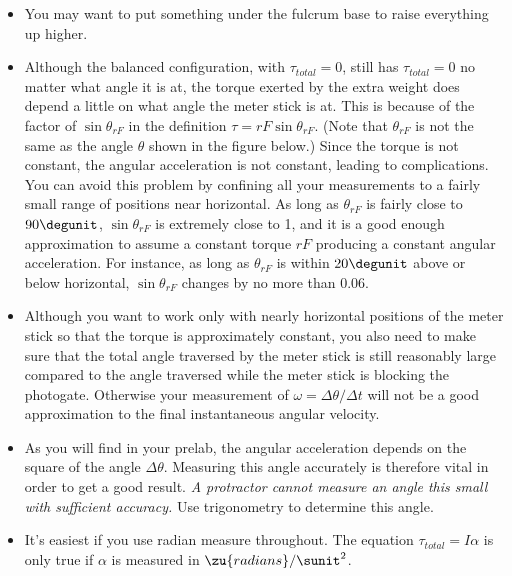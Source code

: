 \begin{itemize}
\item[] You may want to put something under the fulcrum base to
raise everything up higher.

\item[] Although the balanced configuration, with $\tau_{total}=0$,
still has $\tau_{total}=0$ no matter what angle it is at,
the torque exerted by the extra weight does depend a little
on what angle the meter stick is at.  This is because of the
factor of $\sin\theta_{rF} $ in the definition $\tau=rF\sin\theta_{rF} $. 
(Note that $\theta_{rF}$ is not the same as the angle $\theta$
shown in the figure below.)
Since the torque is not constant, the
angular acceleration is not constant, leading to complications.
 You can avoid this problem by confining all your measurements
to a fairly small range of positions near horizontal.  As
long as $\theta_{rF} $ is fairly close to $90\degunit$, $\sin\theta_{rF} $ 
is extremely close to 1, and it is a good enough
approximation to assume a constant torque $rF$
producing a constant angular acceleration. For instance, as
long as $\theta_{rF} $ is within $20\degunit$ above or below
horizontal, $\sin\theta_{rF} $ changes by no more than 0.06.

\item[] Although you want to work only with nearly horizontal
positions of the meter stick so that the torque is
approximately constant, you also need to make sure that the
total angle traversed by the meter stick is still reasonably
large compared to the angle traversed while the meter stick
is blocking the photogate.  Otherwise your measurement of
$\omega =\Delta \theta/\Delta t$ will not be a good approximation to
the final instantaneous angular velocity.

\item[] As you will find in your prelab, the angular acceleration
depends on the square of the angle $\Delta\theta$. Measuring this angle
accurately is therefore vital in order to get a good result.
\emph{A protractor cannot measure an angle this small with
sufficient accuracy.} Use trigonometry to determine this angle.

\item[] It's easiest if you use radian measure throughout.  The
equation $\tau_{total}=I\alpha $ is only true if $\alpha$ is
measured in $\zu{radians}/\sunit^2$.

\end{itemize}

\prelab

